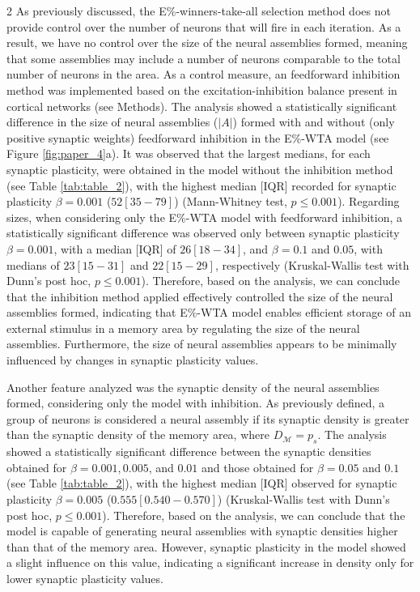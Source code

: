 \documentclass[a4paper, 10pt]{article}
\begin{document}
\begin{multicols}{2}
As previously discussed, the E\%-winners-take-all selection method does not provide control over the number of neurons that will fire in each iteration. As a result, we have no control over the size of the neural assemblies formed, meaning that some assemblies may include a number of neurons comparable to the total number of neurons in the area. As a control measure, an feedforward inhibition method was implemented based on the excitation-inhibition balance present in cortical networks (see Methods). The analysis showed a statistically significant difference in the size of neural assemblies ($|A|$) formed with and without (only positive synaptic weights) feedforward inhibition in the E\%-WTA model (see Figure \ref{fig:paper_4}a). It was observed that the largest medians, for each synaptic plasticity, were obtained in the model without the inhibition method (see Table \ref{tab:table_2}), with the highest median [IQR] recorded for synaptic plasticity $\beta = 0.001$ ($52\left[35 - 79\right]$) (Mann-Whitney test, $p \leq 0.001$). Regarding sizes, when considering only the E\%-WTA model with feedforward inhibition, a statistically significant difference was observed only between synaptic plasticity $\beta = 0.001$, with a median [IQR] of $26\left[18-34\right]$, and $\beta = 0.1$ and $0.05$, with medians of $23\left[15-31\right]$ and $22\left[15-29\right]$, respectively (Kruskal-Wallis test with Dunn’s post hoc, $p \leq 0.001$). Therefore, based on the analysis, we can conclude that the inhibition method applied effectively controlled the size of the neural assemblies formed, indicating that E\%-WTA model enables efficient storage of an external stimulus in a memory area by regulating the size of the neural assemblies. Furthermore, the size of neural assemblies appears to be minimally influenced by changes in synaptic plasticity values.

Another feature analyzed was the synaptic density of the neural assemblies formed, considering only the model with inhibition. As previously defined, a group of neurons is considered a neural assembly if its synaptic density is greater than the synaptic density of the memory area, where $D_{\mathcal{M}} = p_s$. The analysis showed a statistically significant difference between the synaptic densities obtained for $\beta = 0.001, 0.005$, and $0.01$ and those obtained for $\beta = 0.05$ and $0.1$ (see Table \ref{tab:table_2}), with the highest median [IQR] observed for synaptic plasticity $\beta = 0.005$ ($0.555\left[0.540 - 0.570\right]$) (Kruskal-Wallis test with Dunn’s post hoc, $p \leq 0.001$).
Therefore, based on the analysis, we can conclude that the model is capable of generating neural assemblies with synaptic densities higher than that of the memory area. However, synaptic plasticity in the model showed a slight influence on this value, indicating a significant increase in density only for lower synaptic plasticity values. \newline


\end{multicols}
\end{document}

